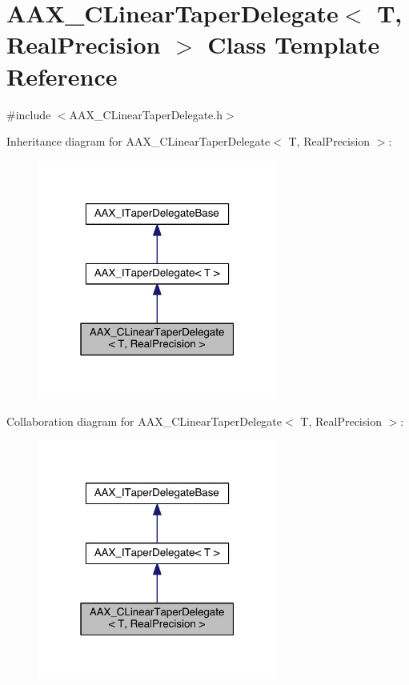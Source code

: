 \hypertarget{a00022}{}\section{A\+A\+X\+\_\+\+C\+Linear\+Taper\+Delegate$<$ T, Real\+Precision $>$ Class Template Reference}
\label{a00022}


{\ttfamily \#include $<$A\+A\+X\+\_\+\+C\+Linear\+Taper\+Delegate.\+h$>$}



Inheritance diagram for A\+A\+X\+\_\+\+C\+Linear\+Taper\+Delegate$<$ T, Real\+Precision $>$\+:
\nopagebreak
\begin{figure}[H]
\begin{center}
\leavevmode
\includegraphics[width=223pt]{a00425}
\end{center}
\end{figure}


Collaboration diagram for A\+A\+X\+\_\+\+C\+Linear\+Taper\+Delegate$<$ T, Real\+Precision $>$\+:
\nopagebreak
\begin{figure}[H]
\begin{center}
\leavevmode
\includegraphics[width=223pt]{a00426}
\end{center}
\end{figure}


